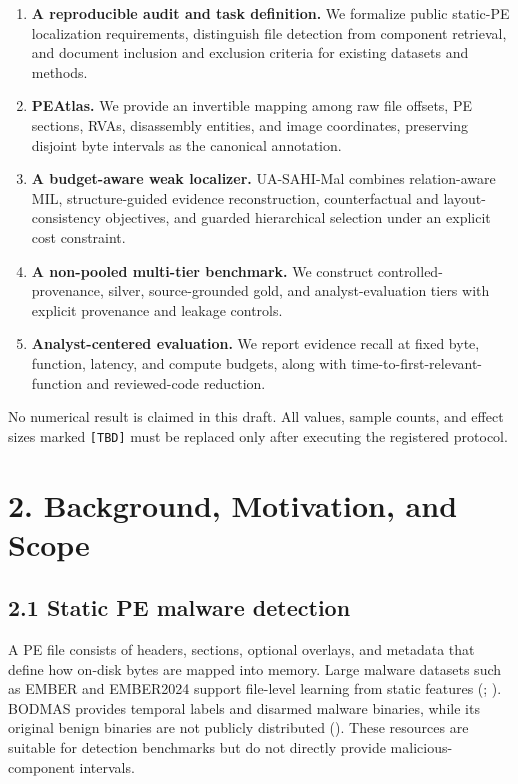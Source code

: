 \documentclass[
  10pt,
]{article}
\providecommand{\tightlist}{%
  \setlength{\itemsep}{0pt}\setlength{\parskip}{0pt}}
\begin{document}
\begin{enumerate}
\def\labelenumi{\arabic{enumi}.}
\tightlist
\item
  \textbf{A reproducible audit and task definition.} We formalize public
  static-PE localization requirements, distinguish file detection from
  component retrieval, and document inclusion and exclusion criteria for
  existing datasets and methods.
\item
  \textbf{PEAtlas.} We provide an invertible mapping among raw file
  offsets, PE sections, RVAs, disassembly entities, and image
  coordinates, preserving disjoint byte intervals as the canonical
  annotation.
\item
  \textbf{A budget-aware weak localizer.} UA-SAHI-Mal combines
  relation-aware MIL, structure-guided evidence reconstruction,
  counterfactual and layout-consistency objectives, and guarded
  hierarchical selection under an explicit cost constraint.
\item
  \textbf{A non-pooled multi-tier benchmark.} We construct
  controlled-provenance, silver, source-grounded gold, and
  analyst-evaluation tiers with explicit provenance and leakage
  controls.
\item
  \textbf{Analyst-centered evaluation.} We report evidence recall at
  fixed byte, function, latency, and compute budgets, along with
  time-to-first-relevant-function and reviewed-code reduction.
\end{enumerate}

No numerical result is claimed in this draft. All values, sample counts,
and effect sizes marked \texttt{{[}TBD{]}} must be replaced only after
executing the registered protocol.

\section{2. Background, Motivation, and
Scope}\label{background-motivation-and-scope}

\subsection{2.1 Static PE malware
detection}\label{static-pe-malware-detection}

A PE file consists of headers, sections, optional overlays, and metadata
that define how on-disk bytes are mapped into memory. Large malware
datasets such as EMBER and EMBER2024 support file-level learning from
static features (; ). BODMAS
provides temporal labels and disarmed malware binaries, while its
original benign binaries are not publicly distributed
(). These resources are
suitable for detection benchmarks but do not directly provide
malicious-component intervals.
\end{document}
